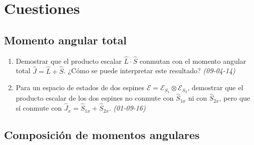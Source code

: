 \section{Cuestiones}

\subsection*{Momento angular total}

\begin{enumerate}
    
    \item Demostrar que el producto escalar \( \hat{L} \cdot \hat{S} \) conmutan con el momento angular total \( \hat{J} = \hat{L} + \hat{S} \). ¿Cómo se puede interpretar este resultado? \textit{(09-04-14)}
    
    \item Para un espacio de estados de dos espines $\mathcal{E} = \mathcal{E}_{S_1} \otimes \mathcal{E}_{S_2}$, demostrar que el producto escalar de los dos espines no conmute con $\hat{S}_{1x}$ ni con $\hat{S}_{2x}$, pero que sí conmute con $\hat{J}_x = \hat{S}_{1x} + \hat{S}_{2x}$. \textit{(01-09-16)}
    

\end{enumerate}

\subsection*{Composición de momentos angulares}

